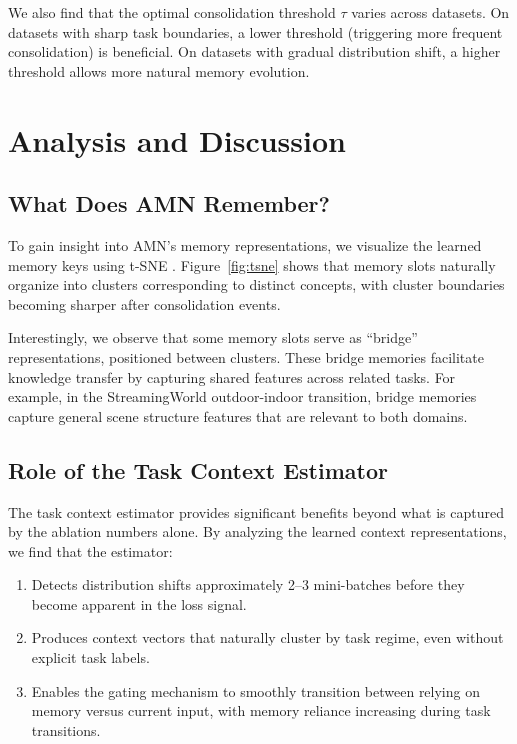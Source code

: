 \documentclass[11pt]{article}
\begin{document}
We also find that the optimal consolidation threshold $\tau$ varies across datasets. On datasets with sharp task boundaries, a lower threshold (triggering more frequent consolidation) is beneficial. On datasets with gradual distribution shift, a higher threshold allows more natural memory evolution.

\section{Analysis and Discussion}
\label{sec:analysis}

\subsection{What Does AMN Remember?}

To gain insight into AMN's memory representations, we visualize the learned memory keys using t-SNE \citep{maaten2008visualizing}. Figure~\ref{fig:tsne} shows that memory slots naturally organize into clusters corresponding to distinct concepts, with cluster boundaries becoming sharper after consolidation events.

Interestingly, we observe that some memory slots serve as ``bridge'' representations, positioned between clusters. These bridge memories facilitate knowledge transfer by capturing shared features across related tasks. For example, in the StreamingWorld outdoor-indoor transition, bridge memories capture general scene structure features that are relevant to both domains.


\subsection{Role of the Task Context Estimator}

The task context estimator provides significant benefits beyond what is captured by the ablation numbers alone. By analyzing the learned context representations, we find that the estimator:
\begin{enumerate}
    \item Detects distribution shifts approximately 2--3 mini-batches before they become apparent in the loss signal.
    \item Produces context vectors that naturally cluster by task regime, even without explicit task labels.
    \item Enables the gating mechanism to smoothly transition between relying on memory versus current input, with memory reliance increasing during task transitions.
\end{enumerate}
\end{document}
